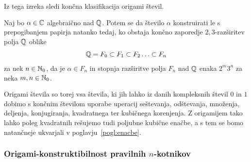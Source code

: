 Iz tega izreka sledi končna klasifikacija origami števil.

\begin{izrek}
    Naj bo $\alpha \in \mathbb C$ algebraično nad $\mathbb Q$. Potem se da število $\alpha$ konstruirati le s prepogibanjem papirja natanko tedaj, ko obstaja končno zaporedje $2,3$-razširitev polja $\mathbb Q$ oblike 
    $$ \mathbb Q = F_0 \subset F_1 \subset F_2 \ldots \subset F_n$$
    za nek $n \in \mathbb N_0$, da je $\alpha \in F_n$ in stopnja razširitve polja $F_n$ nad $\mathbb Q$ enaka $2^m3^n$ za neka $m, n \in \mathbb N_0$.
\end{izrek}

Origami števila so torej vsa števila, ki jih lahko iz danih kompleksnih števil $0$ in $1$ dobimo s končnim številom uporabe uperacij seštevanja, odštevanja, množenja, deljenja, konjugiranja, kvadratnega ter kubičnega korenjenja. Z origamijem tako lahko poleg kvadratnih rešujemo tudi poljubne kubične enačbe, a s tem se bomo natančneje ukvarjali v poglavju~\ref{pogl:enacbe}.

\subsubsection{Origami-konstruktibilnost pravilnih $n$-kotnikov}